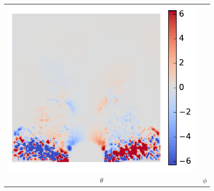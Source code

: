 \documentclass[11pt]{article}
\begin{document}
\begin{figure}[!h]
\begin{tabular}{cc}
         \includegraphics[scale=.5]{img/splitFluxVol/phi.pdf}
         \\
         $\theta $ & $\phi$ 
    \end{tabular}
\end{figure}
\pagebreak
\end{document}
